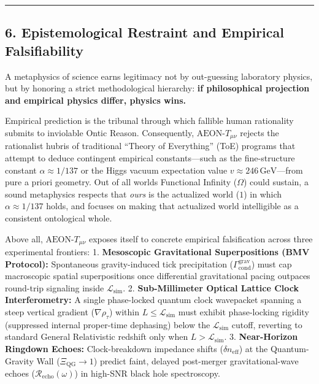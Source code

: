 \documentclass[
]{article}
\begin{document}
\begin{center}\rule{0.5\linewidth}{0.5pt}\end{center}

\subsection{6. Epistemological Restraint and Empirical
Falsifiability}\label{epistemological-restraint-and-empirical-falsifiability}

A metaphysics of science earns legitimacy not by out-guessing laboratory
physics, but by honoring a strict methodological hierarchy: \textbf{if
philosophical projection and empirical physics differ, physics wins.}

Empirical prediction is the tribunal through which fallible human
rationality submits to inviolable Ontic Reason. Consequently,
\(\text{AEON-}T_{\mu\nu}\) rejects the rationalist hubris of traditional
``Theory of Everything'' (ToE) programs that attempt to deduce
contingent empirical constants---such as the fine-structure constant
\(\alpha \approx 1/137\) or the Higgs vacuum expectation value
\(v \approx 246\,\text{GeV}\)---from pure a priori geometry. Out of all
worlds Functional Infinity (\(\Omega\)) could sustain, a sound
metaphysics respects that \emph{ours} is the actualized world (\(1\)) in
which \(\alpha \approx 1/137\) holds, and focuses on making that
actualized world intelligible as a consistent ontological whole.

Above all, \(\text{AEON-}T_{\mu\nu}\) exposes itself to concrete
empirical falsification across three experimental frontiers: 1.
\textbf{Mesoscopic Gravitational Superpositions (BMV Protocol):}
Spontaneous gravity-induced tick precipitation
(\(\Gamma_{\mathrm{cond}}^{\mathrm{grav}}\)) must cap macroscopic
spatial superpositions once differential gravitational pacing outpaces
round-trip signaling inside \(\mathcal{L}_{\mathrm{sim}}\). 2.
\textbf{Sub-Millimeter Optical Lattice Clock Interferometry:} A single
phase-locked quantum clock wavepacket spanning a steep vertical gradient
(\(\nabla\rho_\tau\)) within \(L \le \mathcal{L}_{\mathrm{sim}}\) must
exhibit phase-locking rigidity (suppressed internal proper-time
dephasing) below the \(\mathcal{L}_{\mathrm{sim}}\) cutoff, reverting to
standard General Relativistic redshift only when
\(L > \mathcal{L}_{\mathrm{sim}}\). 3. \textbf{Near-Horizon Ringdown
Echoes:} Clock-breakdown impedance shifts (\(\delta n_{\mathrm{eff}}\))
at the Quantum-Gravity Wall (\(\Xi_{\mathrm{QG}} \to 1\)) predict faint,
delayed post-merger gravitational-wave echoes
(\(\mathcal{R}_{\mathrm{echo}}(\omega)\)) in high-SNR black hole
spectroscopy.
\end{document}
